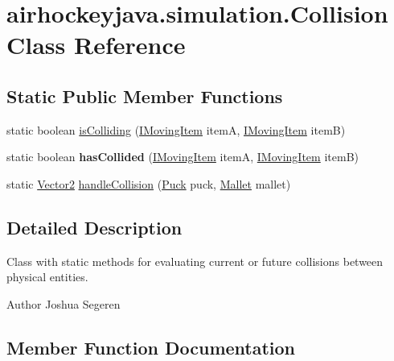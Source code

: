\hypertarget{classairhockeyjava_1_1simulation_1_1_collision}{}\section{airhockeyjava.\+simulation.\+Collision Class Reference}
\label{classairhockeyjava_1_1simulation_1_1_collision}
\subsection*{Static Public Member Functions}
\begin{DoxyCompactItemize}
\item 
static boolean \hyperlink{classairhockeyjava_1_1simulation_1_1_collision_ae9ec1587a927afd0e39c9de6f14d59e9}{is\+Colliding} (\hyperlink{interfaceairhockeyjava_1_1physical_1_1_i_moving_item}{I\+Moving\+Item} item\+A, \hyperlink{interfaceairhockeyjava_1_1physical_1_1_i_moving_item}{I\+Moving\+Item} item\+B)
\item 
\hypertarget{classairhockeyjava_1_1simulation_1_1_collision_af19fedd3a391a9b05262418f70b0b33f}{}static boolean {\bfseries has\+Collided} (\hyperlink{interfaceairhockeyjava_1_1physical_1_1_i_moving_item}{I\+Moving\+Item} item\+A, \hyperlink{interfaceairhockeyjava_1_1physical_1_1_i_moving_item}{I\+Moving\+Item} item\+B)\label{classairhockeyjava_1_1simulation_1_1_collision_af19fedd3a391a9b05262418f70b0b33f}

\item 
static \hyperlink{classairhockeyjava_1_1util_1_1_vector2}{Vector2} \hyperlink{classairhockeyjava_1_1simulation_1_1_collision_aa368543caab06047d1d0f1a0cd0bb779}{handle\+Collision} (\hyperlink{classairhockeyjava_1_1physical_1_1_puck}{Puck} puck, \hyperlink{classairhockeyjava_1_1physical_1_1_mallet}{Mallet} mallet)
\end{DoxyCompactItemize}


\subsection{Detailed Description}
Class with static methods for evaluating current or future collisions between physical entities. \begin{DoxyAuthor}{Author}
Joshua Segeren 
\end{DoxyAuthor}


\subsection{Member Function Documentation}
\hypertarget{classairhockeyjava_1_1simulation_1_1_collision_aa368543caab06047d1d0f1a0cd0bb779}{}
